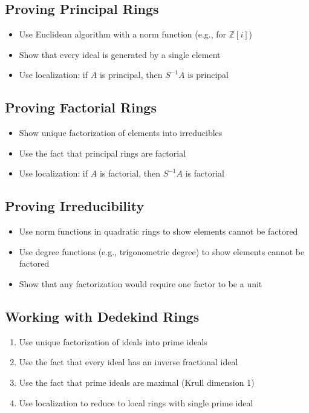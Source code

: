 \subsection*{Proving Principal Rings}
\begin{itemize}
\item Use Euclidean algorithm with a norm function (e.g., for $\mathbb{Z}[i]$)
\item Show that every ideal is generated by a single element
\item Use localization: if $A$ is principal, then $S^{-1}A$ is principal
\end{itemize}

\subsection*{Proving Factorial Rings}
\begin{itemize}
\item Show unique factorization of elements into irreducibles
\item Use the fact that principal rings are factorial
\item Use localization: if $A$ is factorial, then $S^{-1}A$ is factorial
\end{itemize}

\subsection*{Proving Irreducibility}
\begin{itemize}
\item Use norm functions in quadratic rings to show elements cannot be factored
\item Use degree functions (e.g., trigonometric degree) to show elements cannot be factored
\item Show that any factorization would require one factor to be a unit
\end{itemize}

\subsection*{Working with Dedekind Rings}
\begin{enumerate}
\item Use unique factorization of ideals into prime ideals
\item Use the fact that every ideal has an inverse fractional ideal
\item Use the fact that prime ideals are maximal (Krull dimension 1)
\item Use localization to reduce to local rings with single prime ideal
\end{enumerate}

